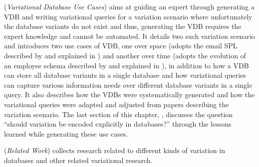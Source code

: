  (\emph{Variational Database Use Cases}) 
aims at guiding an expert through generating a VDB and writing
variational queries for a variation scenario where unfortunately the database variants
do not exist and thus, generating the VDB requires the expert knowledge and cannot
be automated. 
%
It details two such variation scenario and introduces two use cases of VDB, one over space
(adopts the email SPL described by \citet{Hall05} and explained in )
 and another over time (adopts the evolution 
of an employee schema described by \citet{prima08Moon} and explained in ), 
in addition to how a VDB can store all database variants in a single database and
 how variational queries can capture various information needs over different database variants
in a single query. It also describes how  the VDBs were systematically 
generated and how the variational queries
were adapted and adjusted from papers describing the variation scenario. 
%
The last section of this chapter, , discusses the question 
``should variation be encoded explicitly in databases?'' through the lessons learned 
while generating these use cases. 



 (\emph{Related Work}) collects research related to different kinds of variation 
in databases and other related variational research. 


